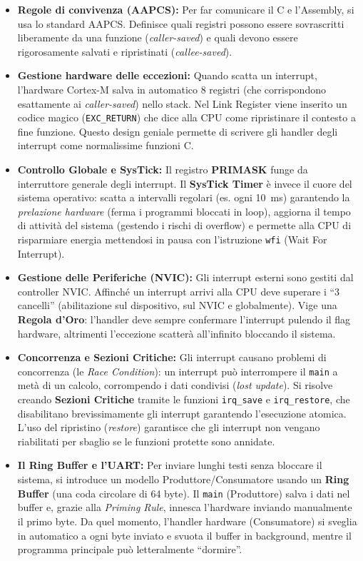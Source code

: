 \begin{itemize}
    \item \textbf{Regole di convivenza (AAPCS):} Per far comunicare il C e l'Assembly, si usa lo standard AAPCS. Definisce quali registri possono essere sovrascritti liberamente da una funzione (\textit{caller-saved}) e quali devono essere rigorosamente salvati e ripristinati (\textit{callee-saved}).
    \item \textbf{Gestione hardware delle eccezioni:} Quando scatta un interrupt, l'hardware Cortex-M salva in automatico 8 registri (che corrispondono esattamente ai \textit{caller-saved}) nello stack. Nel Link Register viene inserito un codice magico (\texttt{EXC\_RETURN}) che dice alla CPU come ripristinare il contesto a fine funzione. Questo design geniale permette di scrivere gli handler degli interrupt come normalissime funzioni C.
    \item \textbf{Controllo Globale e SysTick:} Il registro \textbf{PRIMASK} funge da interruttore generale degli interrupt. Il \textbf{SysTick Timer} è invece il cuore del sistema operativo: scatta a intervalli regolari (es. ogni 10~ms) garantendo la \textit{prelazione hardware} (ferma i programmi bloccati in loop), aggiorna il tempo di attività del sistema (gestendo i rischi di overflow) e permette alla CPU di risparmiare energia mettendosi in pausa con l'istruzione \texttt{wfi} (Wait For Interrupt).
    \item \textbf{Gestione delle Periferiche (NVIC):} Gli interrupt esterni sono gestiti dal controller NVIC. Affinché un interrupt arrivi alla CPU deve superare i ``3 cancelli'' (abilitazione sul dispositivo, sul NVIC e globalmente). Vige una \textbf{Regola d'Oro}: l'handler deve sempre confermare l'interrupt pulendo il flag hardware, altrimenti l'eccezione scatterà all'infinito bloccando il sistema. 
    \item \textbf{Concorrenza e Sezioni Critiche:} Gli interrupt causano problemi di concorrenza (le \textit{Race Condition}): un interrupt può interrompere il \texttt{main} a metà di un calcolo, corrompendo i dati condivisi (\textit{lost update}). Si risolve creando \textbf{Sezioni Critiche} tramite le funzioni \texttt{irq\_save} e \texttt{irq\_restore}, che disabilitano brevissimamente gli interrupt garantendo l'esecuzione atomica. L'uso del ripristino (\textit{restore}) garantisce che gli interrupt non vengano riabilitati per sbaglio se le funzioni protette sono annidate.
    \item \textbf{Il Ring Buffer e l'UART:} Per inviare lunghi testi senza bloccare il sistema, si introduce un modello Produttore/Consumatore usando un \textbf{Ring Buffer} (una coda circolare di 64 byte). Il \texttt{main} (Produttore) salva i dati nel buffer e, grazie alla \textit{Priming Rule}, innesca l'hardware inviando manualmente il primo byte. Da quel momento, l'handler hardware (Consumatore) si sveglia in automatico a ogni byte inviato e svuota il buffer in background, mentre il programma principale può letteralmente ``dormire''.
\end{itemize}

